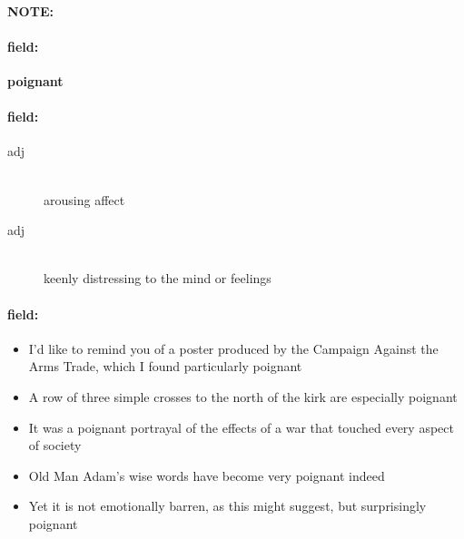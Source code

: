 \documentclass[12pt]{article}
\newenvironment{note}{\paragraph{NOTE:}}{}
\newenvironment{field}{\paragraph{field:}}{}
\begin{document}
\begin{note}
\begin{field}
\textbf{\large poignant}
\end{field}


\begin{field}
\begin{description}
\item[adj] \hfill \\ 
arousing affect

\item[adj] \hfill \\ 
keenly distressing to the mind or feelings

\end{description}
\end{field}

\begin{field}
\begin{itemize}
\item I'd like to remind you of a poster produced by the Campaign Against the Arms Trade, which I found particularly poignant
\item A row of three simple crosses to the north of the kirk are especially poignant
\item It was a poignant portrayal of the effects of a war that touched every aspect of society
\item Old Man Adam's wise words have become very poignant indeed
\item Yet it is not emotionally barren, as this might suggest, but surprisingly poignant
\end{itemize}
\end{field}
\end{note}
\end{document}
